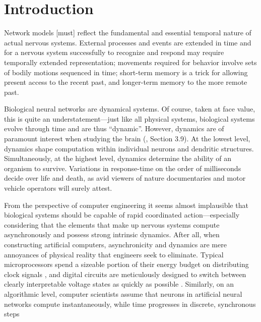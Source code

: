 \chapter{Introduction}
\label{chp:introduction}

\begin{OpeningQuote}
[...] Network models [must] reflect the fundamental and
essential temporal nature of actual nervous systems. External processes and
events are extended in time and for a nervous system successfully to recognize
and respond may require temporally extended representation; movements required for behavior involve sets of bodily motions sequenced in time; short-term memory is a trick for allowing present access to the recent past, and
longer-term memory to the more remote past.
\end{OpeningQuote}


Biological neural networks are dynamical systems.
Of course, taken at face value, this is quite an understatement---just like all physical systems, biological systems evolve through time and are thus \enquote{dynamic}.
However, dynamics are of paramount interest when studying the brain (\cite{churchland1992computational}, Section 3.9).
At the lowest level, dynamics shape computation within individual neurons and dendritic structures.
Simultaneously, at the highest level, dynamics determine the ability of an organism to survive.
Variations in response-time on the order of milliseconds decide over life and death, as avid viewers of nature documentaries and motor vehicle operators will surely attest.

From the perspective of computer engineering it seems almost implausible that biological systems should be capable of rapid coordinated action---especially considering that the elements that make up nervous systems compute asynchronously and possess strong intrinsic dynamics.
After all, when constructing artificial computers, asynchronicity and dynamics are mere annoyances of physical reality that engineers seek to eliminate.
Typical microprocessors spend a sizeable portion of their energy budget on distributing clock signals \citep[e.g.,][]{zhang2008injectionlocked}, and digital circuits are meticulously designed to switch between clearly interpretable voltage states as quickly as possible \citep[e.g.,][Chapter~4]{weste2011cmos}.
Similarly, on an algorithmic level, computer scientists assume that neurons in artificial neural networks compute instantaneously, while time progresses in discrete, synchronous steps \citep[e.g.,][Chapter~10]{goodfellow2016deep}

